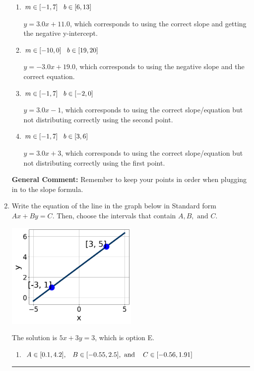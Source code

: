 \documentclass{extbook}[14pt]
\newcommand{\litem}[1]{\item #1

\rule{\textwidth}{0.4pt}}
\begin{document}
\begin{enumerate}
{\begin{enumerate}[label=\Alph*.]
* $y = 3.0x -11.0$, which is the correct option.
\item \( m \in [-1, 7] \hspace*{3mm} b \in [6, 13] \)

 $y = 3.0x + 11.0$, which corresponds to using the correct slope and getting the negative y-intercept.
\item \( m \in [-10, 0] \hspace*{3mm} b \in [19, 20] \)

 $y = -3.0x + 19.0$, which corresponds to using the negative slope and the correct equation.
\item \( m \in [-1, 7] \hspace*{3mm} b \in [-2, 0] \)

 $y = 3.0x -1$, which corresponds to using the correct slope/equation but not distributing correctly using the second point.
\item \( m \in [-1, 7] \hspace*{3mm} b \in [3, 6] \)

 $y = 3.0x + 3$, which corresponds to using the correct slope/equation but not distributing correctly using the first point.
\end{enumerate}

\textbf{General Comment:} Remember to keep your points in order when plugging in to the slope formula.
}
\litem{
Write the equation of the line in the graph below in Standard form $Ax+By=C$. Then, choose the intervals that contain $A, B, \text{ and } C$.

\begin{center}
    \includegraphics[width=0.5\textwidth]{../Figures/linearGraphToStandardA.png}
\end{center}


The solution is \( 5x + 3y = 3 \), which is option E.\begin{enumerate}[label=\Alph*.]
\item \( A \in [0.1, 4.2], \hspace{3mm} B \in [-0.55, 2.5], \text{ and } \hspace{3mm} C \in [-0.56, 1.91] \)


\end{enumerate}}
\end{enumerate}
\end{document}
